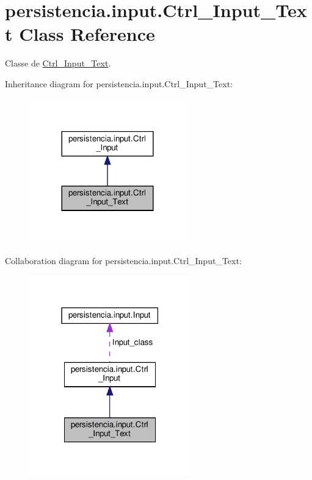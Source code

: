 \hypertarget{classpersistencia_1_1input_1_1Ctrl__Input__Text}{}\section{persistencia.\+input.\+Ctrl\+\_\+\+Input\+\_\+\+Text Class Reference}
\label{classpersistencia_1_1input_1_1Ctrl__Input__Text}


Classe de \hyperlink{classpersistencia_1_1input_1_1Ctrl__Input__Text}{Ctrl\+\_\+\+Input\+\_\+\+Text}.  




Inheritance diagram for persistencia.\+input.\+Ctrl\+\_\+\+Input\+\_\+\+Text\+:\nopagebreak
\begin{figure}[H]
\begin{center}
\leavevmode
\includegraphics[width=192pt]{classpersistencia_1_1input_1_1Ctrl__Input__Text__inherit__graph}
\end{center}
\end{figure}


Collaboration diagram for persistencia.\+input.\+Ctrl\+\_\+\+Input\+\_\+\+Text\+:\nopagebreak
\begin{figure}[H]
\begin{center}
\leavevmode
\includegraphics[width=198pt]{classpersistencia_1_1input_1_1Ctrl__Input__Text__coll__graph}
\end{center}
\end{figure}
